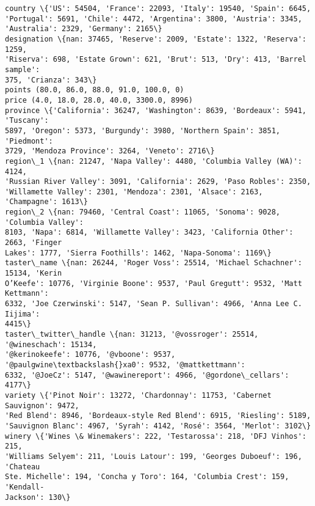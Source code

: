 \documentclass[11pt]{article}
\begin{document}
    \begin{Verbatim}[commandchars=\\\{\}]
country \{'US': 54504, 'France': 22093, 'Italy': 19540, 'Spain': 6645,
'Portugal': 5691, 'Chile': 4472, 'Argentina': 3800, 'Austria': 3345,
'Australia': 2329, 'Germany': 2165\}
designation \{nan: 37465, 'Reserve': 2009, 'Estate': 1322, 'Reserva': 1259,
'Riserva': 698, 'Estate Grown': 621, 'Brut': 513, 'Dry': 413, 'Barrel sample':
375, 'Crianza': 343\}
points (80.0, 86.0, 88.0, 91.0, 100.0, 0)
price (4.0, 18.0, 28.0, 40.0, 3300.0, 8996)
province \{'California': 36247, 'Washington': 8639, 'Bordeaux': 5941, 'Tuscany':
5897, 'Oregon': 5373, 'Burgundy': 3980, 'Northern Spain': 3851, 'Piedmont':
3729, 'Mendoza Province': 3264, 'Veneto': 2716\}
region\_1 \{nan: 21247, 'Napa Valley': 4480, 'Columbia Valley (WA)': 4124,
'Russian River Valley': 3091, 'California': 2629, 'Paso Robles': 2350,
'Willamette Valley': 2301, 'Mendoza': 2301, 'Alsace': 2163, 'Champagne': 1613\}
region\_2 \{nan: 79460, 'Central Coast': 11065, 'Sonoma': 9028, 'Columbia Valley':
8103, 'Napa': 6814, 'Willamette Valley': 3423, 'California Other': 2663, 'Finger
Lakes': 1777, 'Sierra Foothills': 1462, 'Napa-Sonoma': 1169\}
taster\_name \{nan: 26244, 'Roger Voss': 25514, 'Michael Schachner': 15134, 'Kerin
O’Keefe': 10776, 'Virginie Boone': 9537, 'Paul Gregutt': 9532, 'Matt Kettmann':
6332, 'Joe Czerwinski': 5147, 'Sean P. Sullivan': 4966, 'Anna Lee C. Iijima':
4415\}
taster\_twitter\_handle \{nan: 31213, '@vossroger': 25514, '@wineschach': 15134,
'@kerinokeefe': 10776, '@vboone': 9537, '@paulgwine\textbackslash{}xa0': 9532, '@mattkettmann':
6332, '@JoeCz': 5147, '@wawinereport': 4966, '@gordone\_cellars': 4177\}
variety \{'Pinot Noir': 13272, 'Chardonnay': 11753, 'Cabernet Sauvignon': 9472,
'Red Blend': 8946, 'Bordeaux-style Red Blend': 6915, 'Riesling': 5189,
'Sauvignon Blanc': 4967, 'Syrah': 4142, 'Rosé': 3564, 'Merlot': 3102\}
winery \{'Wines \& Winemakers': 222, 'Testarossa': 218, 'DFJ Vinhos': 215,
'Williams Selyem': 211, 'Louis Latour': 199, 'Georges Duboeuf': 196, 'Chateau
Ste. Michelle': 194, 'Concha y Toro': 164, 'Columbia Crest': 159, 'Kendall-
Jackson': 130\}
    \end{Verbatim}

    \begin{center}
    \end{center}
    { \hspace*{\fill} \\}
    
\end{document}
